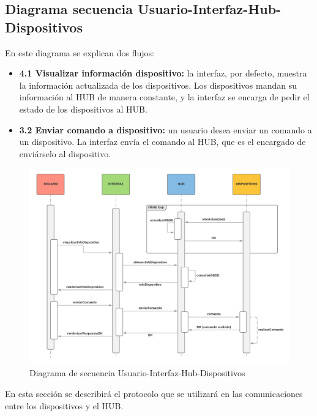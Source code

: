 \subsection{Diagrama secuencia Usuario-Interfaz-Hub-Dispositivos}
En este diagrama se explican dos flujos: 
\begin{itemize}
\item{\textbf{4.1 Visualizar información dispositivo:}} la interfaz, por defecto, muestra la información actualizada de los dispositivos. Los dispositivos mandan su
información al HUB de manera constante, y la interfaz se encarga de pedir el estado de los dispositivos al HUB. 
\item{\textbf{3.2 Enviar comando a dispositivo:}} un usuario desea enviar un comando a un dispositivo. La interfaz envía el comando al HUB, que es el encargado de 
enviárselo al dispositivo.
\end{itemize}
\par
\begin{figure}[H]
\centering
\includegraphics[width=6.00in]{images/diagrama_secuencia_2.png}
\caption{Diagrama de secuencia Usuario-Interfaz-Hub-Dispositivos}
\label{fig:diagrama_secuencia_2}
\end{figure}

En esta sección se describirá el protocolo que se utilizará en las comunicaciones entre los dispositivos y el HUB.
